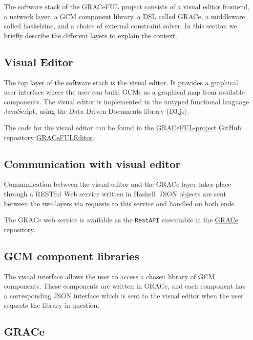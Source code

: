The software stack of the GRACeFUL project consists of
%
a visual editor frontend,
%
a network layer,
%
a GCM component library,
%
a DSL called GRACe,
%
a middleware called haskelzinc, and
%
a choice of external constraint solver.
%
In this section we briefly describe the different layers to explain
the context.

\subsection*{Visual Editor}

The top layer of the software stack is the visual editor.
%
It provides a graphical user interface where the user can build GCMs
as a graphical map from available components.
%
The visual editor is implemented in the untyped functional language
JavaScript, using the Data Driven Documents library (D3.js).
%

The code for the visual editor can be found in the 
\href{https://github.com/GRACeFUL-project}{GRACeFUL-project} GitHub
repository
\href{https://github.com/GRACeFUL-project/GRACeFULEditor}{GRACeFULEditor}.

\subsection*{Communication with visual editor}

Communication between the visual editor and the GRACe layer takes
place through a RESTful Web service written in Haskell.
%
JSON objects are sent between the two layers via requests to this
service and handled on both ends.

The GRACe web service is available as the \texttt{RestAPI} executable in the
\href{https://github.com/GRACeFUL-project/GRACe}{GRACe} repository.

\subsection*{GCM component libraries}

The visual interface allows the user to access a chosen library of GCM
components.
%
These components are written in GRACe, and each component has a
corresponding JSON interface which is sent to the visual editor when
the user requests the library in question.

\subsection*{GRACe}

